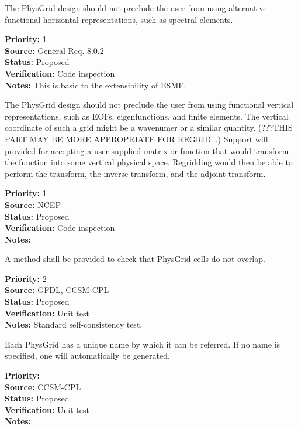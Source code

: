 The PhysGrid design should not preclude the user from using alternative
functional horizontal representations, such as spectral elements.
\begin{reqlist}
{\bf Priority:} 1 \\
{\bf Source:} General Req. 8.0.2 \\
{\bf Status:} Proposed \\
{\bf Verification:} Code inspection \\
{\bf Notes:} This is basic to the extensibility of ESMF.
\end{reqlist}

The PhysGrid design should not preclude the user from using 
functional vertical representations, such as EOFs, eigenfunctions,
and finite elements.  The vertical coordinate of such a grid might be a wavenumer
or a similar quantity.
(???THIS PART MAY BE MORE APPROPRIATE FOR REGRID...) Support will provided for
accepting a user supplied matrix or function that would transform the function into some
vertical physical space. Regridding would then be able to perform the transform, the
inverse transform, and the adjoint transform.
\begin{reqlist}
{\bf Priority:} 1 \\
{\bf Source:} NCEP \\
{\bf Status:} Proposed \\
{\bf Verification:} Code inspection \\
{\bf Notes:} 
\end{reqlist}

A method shall be provided to check that PhysGrid cells do not overlap. 
\begin{reqlist}
{\bf Priority:} 2 \\
{\bf Source:} GFDL, CCSM-CPL \\
{\bf Status:} Proposed \\
{\bf Verification:} Unit test\\
{\bf Notes:} Standard self-consistency test.
\end{reqlist}


Each PhysGrid has a unique name by which it can be referred.  If no name is
specified, one will automatically be generated.
\begin{reqlist}
{\bf Priority:} \\
{\bf Source:} CCSM-CPL \\
{\bf Status:} Proposed \\
{\bf Verification:} Unit test \\
{\bf Notes:} 
\end{reqlist}

